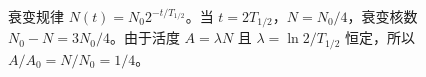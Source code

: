 衰变规律 $N(t)=N_0 2^{-t/T_{1/2}}$。当 $t=2T_{1/2}$，$N=N_0/4$，衰变核数 $N_0-N=3N_0/4$。由于活度 $A=\lambda N$ 且 $\lambda=\ln2/T_{1/2}$ 恒定，所以 $A/A_0=N/N_0=1/4$。
